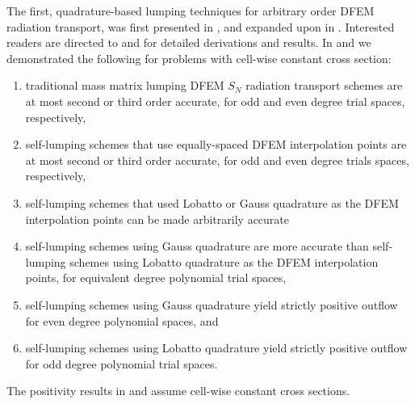 \documentclass[final,3p,times]{elsarticle}
\begin{document}
The first, quadrature-based lumping techniques for arbitrary order DFEM radiation transport, was first presented in \cite{mc_2013}, and expanded upon in \cite{part_1_paper}.
Interested readers are directed to \cite{mc_2013} and \cite{part_1_paper} for detailed derivations and results.
In \cite{mc_2013} and \cite{part_1_paper}  we demonstrated the following for problems with cell-wise constant cross section:
\begin{enumerate}
\item traditional mass matrix lumping \cite{adams} DFEM $S_N$ radiation transport schemes are at most second or third order accurate, for odd and even degree trial spaces, respectively,
\item self-lumping schemes that use equally-spaced DFEM interpolation points are at most second or third order accurate, for odd and even degree trials spaces, respectively,
\item self-lumping schemes that used Lobatto or Gauss quadrature as the DFEM interpolation points can be made arbitrarily accurate
\item self-lumping schemes using Gauss quadrature are more accurate than self-lumping schemes using Lobatto quadrature as the DFEM interpolation points, for equivalent degree polynomial trial spaces,
\item self-lumping schemes using Gauss quadrature yield strictly positive outflow for even degree polynomial spaces, and
\item self-lumping schemes using Lobatto quadrature yield strictly positive outflow for odd degree polynomial trial spaces. 
\end{enumerate}
The positivity results in \cite{mc_2013} and \cite{part_1_paper} assume cell-wise constant cross sections.
\end{document}
